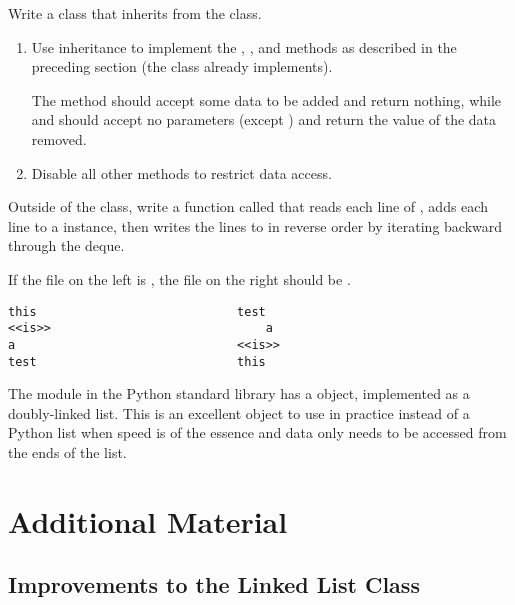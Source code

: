 \begin{problem} %
Write a  class that inherits from the  class.
\begin{enumerate}
\item Use inheritance to implement the , , and  methods as described in the preceding section (the  class already implements).

The  method should accept some data to be added and return nothing, while  and  should accept no parameters (except ) and return the value of the data removed.

\item Disable all other methods to restrict data access.
\end{enumerate}

Outside of the class, write a function called  that reads each line of , adds each line to a  instance, then writes the lines to  in reverse order by iterating backward through the deque.

If the file on the left is , the file on the right should be .
\begin{lstlisting}
this                            test
<<is>>                              a
a                               <<is>>
test                            this
\end{lstlisting}
\end{problem}

\begin{info} %
The  module in the Python standard library has a  object, implemented as a doubly-linked list.
This is an excellent object to use in practice instead of a Python list when speed is of the essence and data only needs to be accessed from the ends of the list.
\end{info}

\newpage

\section*{Additional Material} %

\subsection*{Improvements to the Linked List Class} %

